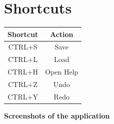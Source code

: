 \documentclass[12pt]{article}
\begin{document}
\section*{Shortcuts}

\begin{center}
\begin{tabular}{ |c|c|} 
 \hline
 \textbf{Shortcut} & \textbf{Action} \\ 
  \hline
 CTRL+S & Save \\ 
  \hline
 CTRL+L & Load \\ 
 \hline
 CTRL+H & Open Help  \\ 
  \hline
 CTRL+Z & Undo \\
  \hline
 CTRL+Y & Redo \\
  \hline
\end{tabular}
\end{center}

\clearpage
\vspace*{\fill}
\begin{center}
{\huge \textbf{Screenshots of the application}}
\end{center}
\vfill 
\clearpage
\end{document}
